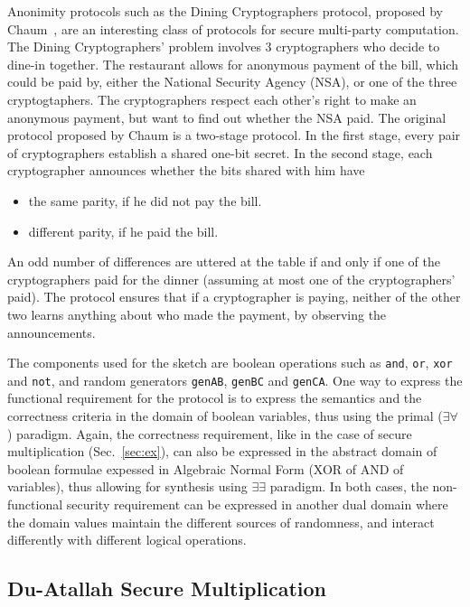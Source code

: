 \documentclass[preprint]{sig-alternate-05-2015}
\begin{document}
Anonimity protocols such as the Dining Cryptographers protocol,
proposed by Chaum~\cite{Chaum88}, are an interesting class of protocols for secure
multi-party computation.
The Dining Cryptographers' problem involves 3 cryptographers who decide to
dine-in together. The restaurant allows for anonymous payment of the bill,
which could be paid by, either the National Security Agency (NSA),
or one of the three cryptogtaphers.
The cryptographers respect each other's right to make an anonymous payment, 
but want to find out whether the NSA paid.
The original protocol proposed by Chaum is a two-stage protocol.
In the first stage, every pair of cryptographers establish 
a shared one-bit secret. 
In the second stage, each cryptographer announces 
whether the bits shared with him have
\begin{itemize}
    \item the same parity, if he did not pay the bill.
    \item different parity, if he paid the bill.
\end{itemize}
An odd number of differences are uttered at the table if and only if
one of the cryptographers paid for the dinner (assuming at most 
one of the cryptographers' paid).
The protocol ensures that if a cryptographer is paying, 
neither of the other two learns anything about who made the payment, 
by observing the announcements.

The components used for the sketch are boolean operations such as \texttt{and},
\texttt{or}, \texttt{xor} and \texttt{not}, and random generators \texttt{genAB},
\texttt{genBC} and \texttt{genCA}.
One way to express the functional requirement for the protocol is to 
express the semantics and the correctness criteria in the domain of boolean variables,
thus using the primal ($\exists \forall$) paradigm.
Again, the correctness requirement, like in the case of secure 
multiplication (Sec.~\ref{sec:ex}), can also be expressed in the
abstract domain of boolean formulae expessed in Algebraic Normal Form 
(XOR of AND of variables), thus allowing for synthesis using $\exists \exists$
paradigm.
In both cases, the non-functional security requirement
can be expressed in another dual domain where the domain values
maintain the different sources of randomness, 
and interact differently with different logical operations.

\subsection{Du-Atallah Secure Multiplication}
\end{document}
